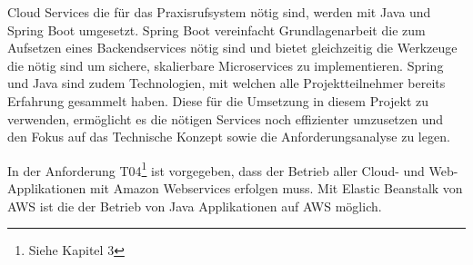 Cloud Services die für das Praxisrufsystem nötig sind, werden mit Java und Spring Boot umgesetzt.
Spring Boot vereinfacht Grundlagenarbeit die zum Aufsetzen eines Backendservices nötig sind und bietet
gleichzeitig die Werkzeuge die nötig sind um sichere, skalierbare Microservices zu implementieren.\cite{why-spring}
Spring und Java sind zudem Technologien, mit welchen alle Projektteilnehmer bereits Erfahrung gesammelt haben.
Diese für die Umsetzung in diesem Projekt zu verwenden, ermöglicht es die nötigen Services noch effizienter umzusetzen
und den Fokus auf das Technische Konzept sowie die Anforderungsanalyse zu legen.

In der Anforderung T04\footnote{Siehe Kapitel 3} ist vorgegeben, dass der Betrieb aller Cloud- und Web-Applikationen mit Amazon Webservices erfolgen muss.
Mit Elastic Beanstalk von AWS ist die der Betrieb von Java Applikationen auf AWS möglich.\cite{aws-spring-java}


